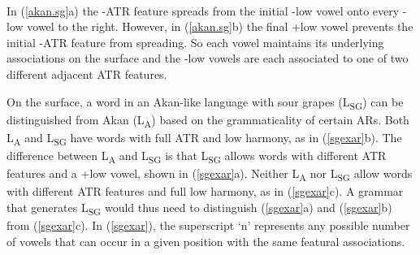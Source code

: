 \documentclass[,doc,floatsintext]{apa6}
\theoremstyle{definition}
\theoremstyle{definition}
\theoremstyle{definition}
\theoremstyle{remark}
\begin{document}
\begin{exe}
\label{akan.sg} \\
\end{exe}

\noindent In (\ref{akan.sg}a) the -ATR feature spreads from the initial
-low vowel onto every -low vowel to the right. However, in
(\ref{akan.sg}b) the final +low vowel prevents the initial -ATR feature
from spreading. So each vowel maintains its underlying associations on
the surface and the -low vowels are each associated to one of two
different adjacent ATR features.

On the surface, a word in an Akan-like language with sour grapes
(L\textsubscript{SG}) can be distinguished from Akan
(L\textsubscript{A}) based on the grammaticality of certain ARs. Both
L\textsubscript{A} and L\textsubscript{SG} have words with full ATR and
low harmony, as in (\ref{sgexar}b). The difference between
L\textsubscript{A} and L\textsubscript{SG} is that L\textsubscript{SG}
allows words with different ATR features and a +low vowel, shown in
(\ref{sgexar}a). Neither L\textsubscript{A} nor L\textsubscript{SG}
allow words with different ATR features and full low harmony, as in
(\ref{sgexar}c). A grammar that generates L\textsubscript{SG} would thus
need to distinguish (\ref{sgexar}a) and (\ref{sgexar}b) from
(\ref{sgexar}c). In (\ref{sgexar}), the superscript `n' represents any
possible number of vowels that can occur in a given position with the
same featural associations.
\end{document}
